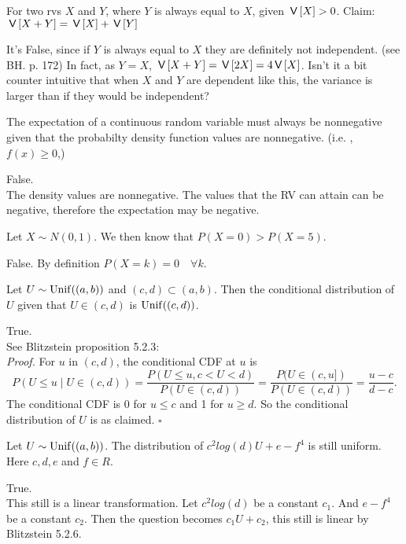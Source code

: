 \documentclass[tf-tutorial-all.tex]{subfiles}
\begin{document}
\begin{truefalse}
For two rvs $X$ and $Y$, where $Y$ is always equal to $X$, given $\,\mathsf{V}\left[X\right]>0$. Claim: $\,\mathsf{V}\left[X+Y\right] = \,\mathsf{V}\left[X\right] + \,\mathsf{V}\left[Y\right]$
\begin{solution}
It's False, since if $Y$ is always equal to $X$ they are definitely not independent.
(see BH.
p.
172) In fact, as $Y=X$, $\,\mathsf{V}\left[X+Y\right] = \,\mathsf{V}\left[2X\right] = 4 \,\mathsf{V}\left[X\right]$.
Isn't it a bit counter intuitive that when $X$ and $Y$ are dependent like this, the variance is larger than if they would be independent?
\end{solution}
\end{truefalse}

\begin{truefalse}
The expectation of a continuous random variable must always be nonnegative given that the probabilty density function values are nonnegative. (i.e. , $f(x) \geq 0$,)
\begin{solution}
False.\\
The density values are nonnegative. The values that the RV can attain can be negative, therefore the expectation may be negative.
\end{solution}
\end{truefalse}

\begin{truefalse}
Let $X \sim N(0, 1)$. We then know that $P(X = 0) > P(X = 5)$.
\begin{solution}
False. By definition $P(X = k) = 0 \quad \forall k $.
\end{solution}
\end{truefalse}

\begin{truefalse}
Let $U \sim \mathrm{Unif}((a,b))$ and  $(c,d) \subset (a,b)$. Then the conditional distribution of $U$ given that $U \in (c,d)$ is $\mathrm{Unif}((c,d))$.
\begin{solution}
True.
\\See Blitzstein proposition 5.2.3:\\
\textit{Proof.} For $u$ in $(c, d)$, the conditional CDF at $u$ is
$$
P(U \leq u \mid U \in(c, d))=\frac{P(U \leq u, c<U<d)}{P(U \in(c, d))}=\frac{P(U \in(c, u])}{P(U \in(c, d))}=\frac{u-c}{d-c} .
$$
The conditional CDF is 0 for $u \leq c$ and 1 for $u \geq d$. So the conditional distribution of $U$ is as claimed.
$\square$
\end{solution}
\end{truefalse}

\begin{truefalse}
Let $U \sim \mathrm{Unif}((a,b))$. The distribution of $c^{2} log(d)U + e - f^{4}$ is still uniform. Here $c,d, e $ and $ f \in R$. \\
\begin{solution}
True.\\
This still is a linear transformation. Let $c^{2} log(d)$ be a constant $c_{1}$. And $e - f^{4}$ be a constant $c_{2}$. Then the question becomes $c_{1} U + c_{2} $, this still is linear by Blitzstein 5.2.6.
\end{solution}
\end{truefalse}
\end{document}
